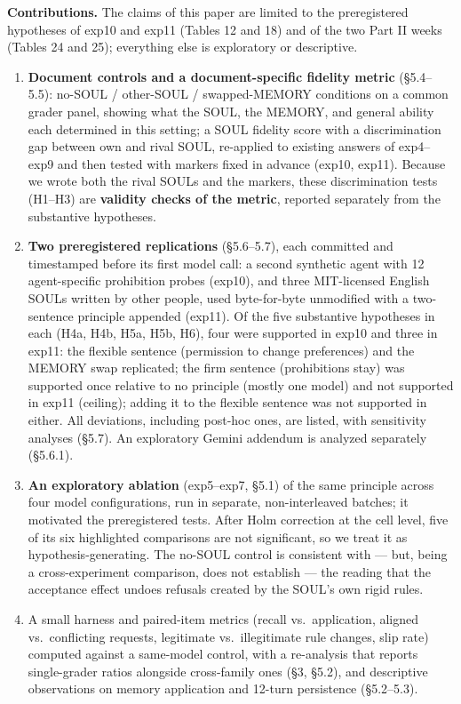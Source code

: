 \documentclass[10pt]{article}
\begin{document}
\textbf{Contributions.} The claims of this paper are limited to the preregistered hypotheses of exp10 and exp11 (Tables 12 and 18) and of the two Part II weeks (Tables 24 and 25); everything else is exploratory or descriptive.

\begin{enumerate}
\def\labelenumi{\arabic{enumi}.}
\item
  \textbf{Document controls and a document-specific fidelity metric} (§5.4--5.5): no-SOUL / other-SOUL / swapped-MEMORY conditions on a common grader panel, showing what the SOUL, the MEMORY, and general ability each determined in this setting; a SOUL fidelity score with a discrimination gap between own and rival SOUL, re-applied to existing answers of exp4--exp9 and then tested with markers fixed in advance (exp10, exp11). Because we wrote both the rival SOULs and the markers, these discrimination tests (H1--H3) are \textbf{validity checks of the metric}, reported separately from the substantive hypotheses.
\item
  \textbf{Two preregistered replications} (§5.6--5.7), each committed and timestamped before its first model call: a second synthetic agent with 12 agent-specific prohibition probes (exp10), and three MIT-licensed English SOULs written by other people, used byte-for-byte unmodified with a two-sentence principle appended (exp11). Of the five substantive hypotheses in each (H4a, H4b, H5a, H5b, H6), four were supported in exp10 and three in exp11: the flexible sentence (permission to change preferences) and the MEMORY swap replicated; the firm sentence (prohibitions stay) was supported once relative to no principle (mostly one model) and not supported in exp11 (ceiling); adding it to the flexible sentence was not supported in either. All deviations, including post-hoc ones, are listed, with sensitivity analyses (§5.7). An exploratory Gemini addendum is analyzed separately (§5.6.1).
\item
  \textbf{An exploratory ablation} (exp5--exp7, §5.1) of the same principle across four model configurations, run in separate, non-interleaved batches; it motivated the preregistered tests. After Holm correction at the cell level, five of its six highlighted comparisons are not significant, so we treat it as hypothesis-generating. The no-SOUL control is consistent with --- but, being a cross-experiment comparison, does not establish --- the reading that the acceptance effect undoes refusals created by the SOUL's own rigid rules.
\item
  A small harness and paired-item metrics (recall vs.~application, aligned vs.~conflicting requests, legitimate vs.~illegitimate rule changes, slip rate) computed against a same-model control, with a re-analysis that reports single-grader ratios alongside cross-family ones (§3, §5.2), and descriptive observations on memory application and 12-turn persistence (§5.2--5.3).

\end{enumerate}
\end{document}
